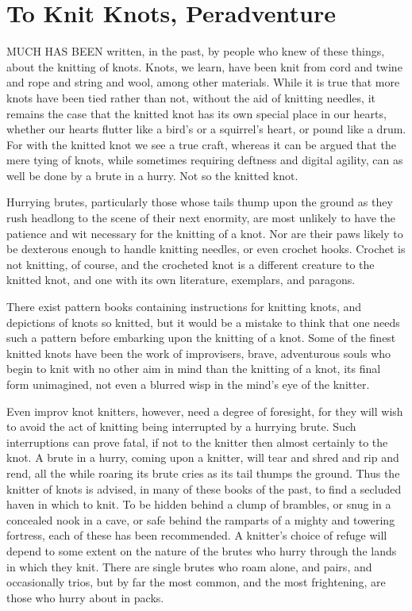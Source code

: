 \chapter{To Knit Knots, Peradventure}

MUCH HAS BEEN written, in the past, by people who knew of these things, about the knitting of knots. Knots, we learn, have been knit from cord and twine and rope and string and wool, among other materials. While it is true that more knots have been tied rather than not, without the aid of knitting needles, it remains the case that the knitted knot has its own special place in our hearts, whether our hearts flutter like a bird's or a squirrel's heart, or pound like a drum. For with the knitted knot we see a true craft, whereas it can be argued that the mere tying of knots, while sometimes requiring deftness and digital agility, can as well be done by a brute in a hurry. Not so the knitted knot.

Hurrying brutes, particularly those whose tails thump upon the ground as they rush headlong to the scene of their next enormity, are most unlikely to have the patience and wit necessary for the knitting of a knot. Nor are their paws likely to be dexterous enough to handle knitting needles, or even crochet hooks. Crochet is not knitting, of course, and the crocheted knot is a different creature to the knitted knot, and one with its own literature, exemplars, and paragons.

There exist pattern books containing instructions for knitting knots, and depictions of knots so knitted, but it would be a mistake to think that one needs such a pattern before embarking upon the knitting of a knot. Some of the finest knitted knots have been the work of improvisers, brave, adventurous souls who begin to knit with no other aim in mind than the knitting of a knot, its final form unimagined, not even a blurred wisp in the mind's eye of the knitter.

Even improv knot knitters, however, need a degree of foresight, for they will wish to avoid the act of knitting being interrupted by a hurrying brute. Such interruptions can prove fatal, if not to the knitter then almost certainly to the knot. A brute in a hurry, coming upon a knitter, will tear and shred and rip and rend, all the while roaring its brute cries as its tail thumps the ground. Thus the knitter of knots is advised, in many of these books of the past, to find a secluded haven in which to knit. To be hidden behind a clump of brambles, or snug in a concealed nook in a cave, or safe behind the ramparts of a mighty and towering fortress, each of these has been recommended. A knitter's choice of refuge will depend to some extent on the nature of the brutes who hurry through the lands in which they knit. There are single brutes who roam alone, and pairs, and occasionally trios, but by far the most common, and the most frightening, are those who hurry about in packs.

